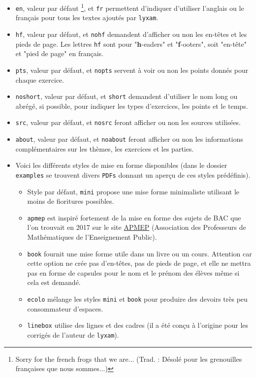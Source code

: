 \documentclass[12pt,a4paper]{scrartcl}
\theoremstyle{definition}
\begin{document}
\begin{itemize}
	\item \verb+en+, valeur par défaut
	\footnote{
		Sorry for the french frogs that we are... (Trad. : Désolé pour les grenouilles françaises que nous sommes...)
	}, et \verb+fr+ permettent d'indiquer d'utiliser l'anglais ou le français pour tous les textes ajoutés par \verb+lyxam+.

	\item \verb+hf+, valeur par défaut, et \verb+nohf+ demandent d'afficher ou non les en-têtes et les pieds de page.
	Les lettres \verb+hf+ sont pour "\textbf{h}-eaders" et "\textbf{f}-ooters", soit "en-tête" et "pied de page" en français.

	\item \verb+pts+, valeur par défaut, et \verb+nopts+ servent à voir ou non les points donnés pour chaque exercice.

	\item \verb+noshort+, valeur par défaut, et \verb+short+ demandent d'utiliser le nom long ou abrégé, si possible, pour indiquer les types d'exercices, les points et le temps.

	\item \verb+src+, valeur par défaut, et \verb+nosrc+ feront afficher ou non les sources utilisées.

	\item \verb+about+, valeur par défaut, et \verb+noabout+ feront afficher ou non les informations complémentaires sur les thèmes, les exercices et les parties.

	\item Voici les différents styles de mise en forme disponibles (dans le dossier \verb+examples+ se trouvent divers \verb+PDFs+ donnant un aperçu de ces styles prédéfinis).
	\begin{itemize}[label={\small\textbullet}]
        \item Style par défaut, \verb+mini+ propose une mise forme minimaliste utilisant le moins de fioritures possibles.
        
        \item \verb+apmep+ est inspiré fortement de la mise en forme des sujets de BAC que l'on trouvait en 2017 sur le site \href{https://www.apmep.fr}{APMEP} (Association des Professeurs de Mathématiques de l'Enseignement Public).
        
        \item \verb+book+ fournit une mise forme utile dans un livre ou un cours. Attention car cette option ne crée pas d'en-têtes, pas de pieds de page, et elle ne mettra pas en forme de capsules pour le nom et le prénom des élèves même si cela est demandé.
        
        \item \verb+ecolo+ mélange les styles \verb+mini+ et \verb+book+ pour produire des devoirs très peu consommateur d'espaces.
        
        \item \verb+linebox+ utilise des lignes et des cadres (il a été conçu à l'origine pour les corrigés de l'auteur de \verb+lyxam+).

\end{itemize}
\end{itemize}
\end{document}
